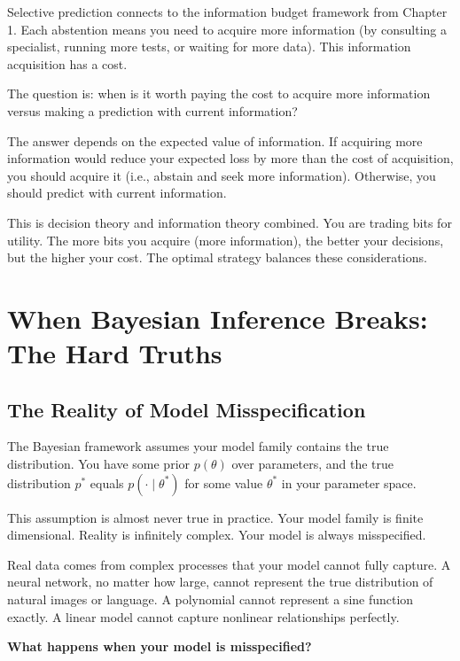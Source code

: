 Selective prediction connects to the information budget framework from Chapter 1. Each abstention means you need to acquire more information (by consulting a specialist, running more tests, or waiting for more data). This information acquisition has a cost.

The question is: when is it worth paying the cost to acquire more information versus making a prediction with current information?

The answer depends on the expected value of information. If acquiring more information would reduce your expected loss by more than the cost of acquisition, you should acquire it (i.e., abstain and seek more information). Otherwise, you should predict with current information.

This is decision theory and information theory combined. You are trading bits for utility. The more bits you acquire (more information), the better your decisions, but the higher your cost. The optimal strategy balances these considerations.

\vspace{2em}

\section{When Bayesian Inference Breaks: The Hard Truths}

\subsection{The Reality of Model Misspecification}

The Bayesian framework assumes your model family contains the true distribution. You have some prior $p(\theta)$ over parameters, and the true distribution $p^*$ equals $p(\cdot \mid \theta^*)$ for some value $\theta^*$ in your parameter space.

This assumption is almost never true in practice. Your model family is finite dimensional. Reality is infinitely complex. Your model is always misspecified.

Real data comes from complex processes that your model cannot fully capture. A neural network, no matter how large, cannot represent the true distribution of natural images or language. A polynomial cannot represent a sine function exactly. A linear model cannot capture nonlinear relationships perfectly.

\textbf{What happens when your model is misspecified?}

